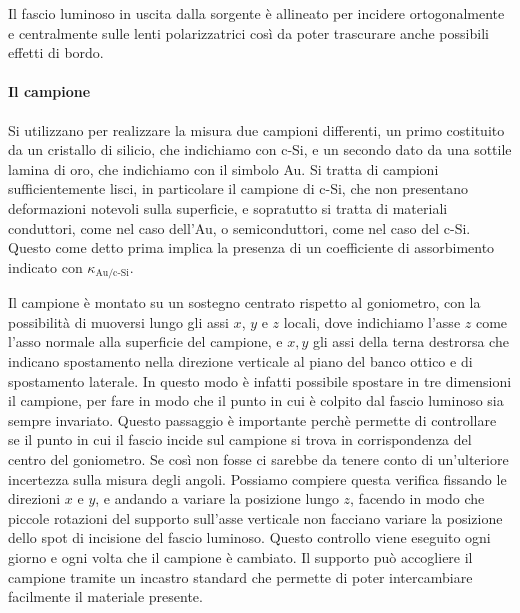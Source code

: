 \documentclass[
    prb,altaffilletter,citeautoscript,
    amsmath,amssymb,
    showpacs,showkeys,floatfix,
    reprint
]{revtex4-1}
\begin{document}
Il fascio luminoso in uscita dalla sorgente è allineato per incidere ortogonalmente e centralmente sulle lenti polarizzatrici così da poter trascurare anche possibili effetti di bordo. 

\paragraph*{Il campione} Si utilizzano per realizzare la misura due campioni differenti, un primo costituito da un cristallo di silicio, che indichiamo con c-Si, e un secondo dato da una sottile lamina di oro, che indichiamo con il simbolo Au. Si tratta di campioni sufficientemente lisci, in particolare il campione di c-Si, che non presentano deformazioni notevoli sulla superficie, e sopratutto si tratta di materiali conduttori, come nel caso dell'Au, o semiconduttori, come nel caso del c-Si. Questo come detto prima implica la presenza di un coefficiente di assorbimento indicato con $\kappa_\text{Au/c-Si}$. 

Il campione è montato su un sostegno centrato rispetto al goniometro, con la possibilità di muoversi lungo gli assi $x$, $y$ e $z$ locali, dove indichiamo l'asse $z$ come l'asso normale alla superficie del campione, e $x, y$ gli assi della terna destrorsa che indicano spostamento nella direzione verticale al piano del banco ottico e di spostamento laterale. In questo modo è infatti possibile spostare in tre dimensioni il campione, per fare in modo che il punto in cui è colpito dal fascio luminoso sia sempre invariato. Questo passaggio è importante perchè permette di controllare se il punto in cui il fascio incide sul campione si trova in corrispondenza del centro del goniometro. Se così non fosse ci sarebbe da tenere conto di un'ulteriore incertezza sulla misura degli angoli. Possiamo compiere questa verifica fissando le direzioni $x$ e $y$, e andando a variare la posizione lungo $z$, facendo in modo che piccole rotazioni del supporto sull'asse verticale non facciano variare la posizione dello spot di incisione del fascio luminoso. Questo controllo viene eseguito ogni giorno e ogni volta che il campione è cambiato. Il supporto può accogliere il campione tramite un incastro standard che permette di poter intercambiare facilmente il materiale presente. 
\end{document}
